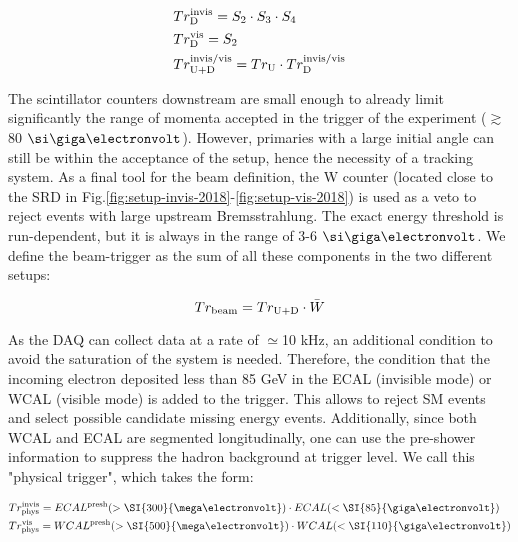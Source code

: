 \begin{equation}
\label{eq:trigger-downstream}
\begin{split}      
& Tr^{\rm{invis}}_{\rm{D}} = S_2 \cdot S_3 \cdot S_4 \\
& Tr^{\rm{vis}}_{\rm{D}} = S_2 \\
& Tr^{\rm{invis/vis}}_{\rm{U}+\rm{D}} = Tr_{\rm{U}} \cdot Tr^{\rm{invis/vis}}_{\rm{D}}
\end{split}
\end{equation}

The scintillator counters downstream are small enough to already limit significantly the range of momenta accepted in the trigger of the experiment ($\gtrsim$ 80 $\gev$). However, primaries with a large initial angle can still be within the acceptance of the setup, hence the necessity of a tracking system. As a final tool for the beam definition, the W counter (located close to the SRD in Fig.\ref{fig:setup-invis-2018}-\ref{fig:setup-vis-2018}) is used as a veto to reject events with large upstream Bremsstrahlung. The exact energy threshold is run-dependent, but it is always in the range of 3-6 $\gev$. We define the beam-trigger as the sum of all these components in the two different setups:

\begin{equation}
\label{eq:trigger-beam}
Tr_{\rm{beam}} = Tr_{\rm{U}+\rm{D}} \cdot \bar{W}
\end{equation}

As the DAQ can collect data at a rate of $\simeq$10 \si{kHz}, an additional condition to avoid the saturation of the system is needed. Therefore, the condition that the incoming electron deposited less than 85 GeV in the ECAL (invisible mode) or WCAL (visible mode) is added to the trigger. This allows to reject SM events and select possible candidate missing energy events. Additionally, since both WCAL and ECAL are segmented longitudinally, one can use the pre-shower information to suppress the hadron background at trigger level. We call this "physical trigger", which takes the form:

\begin{equation}
\label{eq:trigger-phys}
\begin{split}
& Tr^{\rm{invis}}_{\rm{phys}} = ECAL^{\rm{presh}}(> \SI{300}{\mega\electronvolt}) \cdot ECAL(<\SI{85}{\giga\electronvolt})\\
& Tr^{\rm{vis}}_{\rm{phys}} = WCAL^{\rm{presh}}(>\SI{500}{\mega\electronvolt}) \cdot WCAL(<\SI{110}{\giga\electronvolt})
\end{split}
\end{equation}

